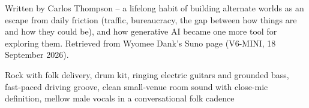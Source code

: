 
\label{sec:entre-mundos}
\begin{notes}
Written by Carlos Thompson -- a lifelong habit of building alternate worlds as an escape from daily friction (traffic, bureaucracy, the gap between how things are and how they could be), and how generative AI became one more tool for exploring them. Retrieved from Wyomee Dank's Suno page (V6-MINI, 18 September 2026).
\end{notes}
\begin{style}
Rock with folk delivery, drum kit, ringing electric guitars and grounded bass, fast-paced driving groove, clean small-venue room sound with close-mic definition, mellow male vocals in a conversational folk cadence
\end{style}
